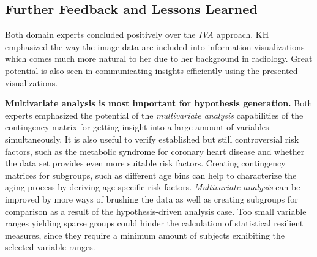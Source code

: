 \documentclass[journal]{style/vgtc} 			          %
\newcommand{\com}[1]{\textcolor{orange}{\uline{#1}}}
\begin{document}

\subsection{Further Feedback and Lessons Learned} \label{Lessons Learned}
%
Both domain experts concluded positively over the \emph{IVA} approach. %
%
KH emphasized the way the image data are included into information visualizations which comes much more natural to her due to her background in radiology.
%
%
Great potential is also seen in communicating insights efficiently using the presented visualizations.

\textbf{Multivariate analysis is most important for hypothesis generation.}
Both experts emphasized the potential of the \emph{multivariate analysis} capabilities of the contingency matrix for getting insight into a large amount of variables simultaneously.
%
It is also useful to verify established but still controversial risk factors, such as the metabolic syndrome for coronary heart disease and whether the data set provides even more suitable risk factors.
%
Creating contingency matrices for subgroups, such as different age bins can help to characterize the aging process by deriving age-specific risk factors.
%
\emph{Multivariate analysis} can be improved by more ways of brushing the data as well as creating subgroups for comparison as a result of the hypothesis-driven analysis case.
%
Too small variable ranges yielding sparse groups could hinder the calculation of statistical resilient measures, since they require a minimum amount of subjects exhibiting the selected variable ranges.
%
\end{document}
